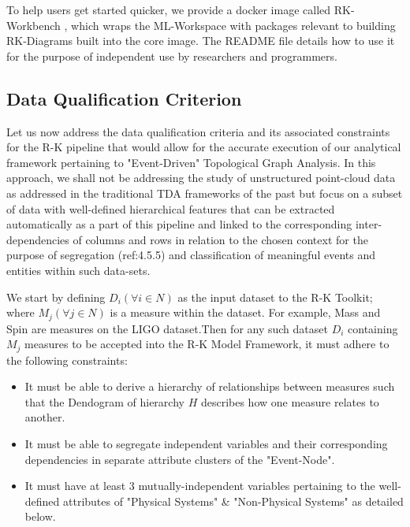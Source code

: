 To help users get started quicker, we provide a docker image called RK-Workbench \cite{andorsk_2021_andorskrkworkbench}, which wraps the ML-Workspace \cite{mltooling_2021_mltoolingmlworkspace} with packages relevant to building RK-Diagrams built into the core image. The README file details how to use it for the purpose of independent use by researchers and programmers. 

\subsection{Data Qualification Criterion}

Let us now address the data qualification criteria and its associated constraints for the R-K pipeline that would allow for the accurate execution of our analytical framework pertaining to "Event-Driven" Topological Graph Analysis. In this approach, we shall not be addressing the study of unstructured point-cloud data as addressed in the traditional TDA frameworks of the past \cite{01.9_2007MapperPBG} \cite{02_carlsson2009topology} \cite{02.3_2017introductionTDA} but focus on a subset of data with well-defined hierarchical features that can be extracted automatically as a part of this pipeline and linked to the corresponding inter-dependencies of columns and rows in relation to the chosen context for the purpose of segregation (ref:4.5.5) and classification of meaningful events and entities within such data-sets.

We start by defining $D_i (\forall i \in N)$ as the input dataset to the R-K Toolkit; where $M_j (\forall j \in N)$ is a measure within the dataset. For example, Mass and Spin are measures on the LIGO dataset.\cite{00_LIGOOpenSciData}Then for any such dataset $D_i$ containing $M_j$ measures to be accepted into the R-K Model Framework, it must adhere to the following constraints:

\begin{itemize}
	\item It must be able to derive a hierarchy of relationships between measures such that the Dendogram of hierarchy $H$ describes how one measure relates to another.
	\item It must be able to segregate independent variables and their corresponding dependencies in separate attribute clusters of the "Event-Node".
	\item It must have at least 3 mutually-independent variables pertaining to the well-defined attributes of "Physical Systems" \&  "Non-Physical Systems" as detailed below.
\end{itemize}

